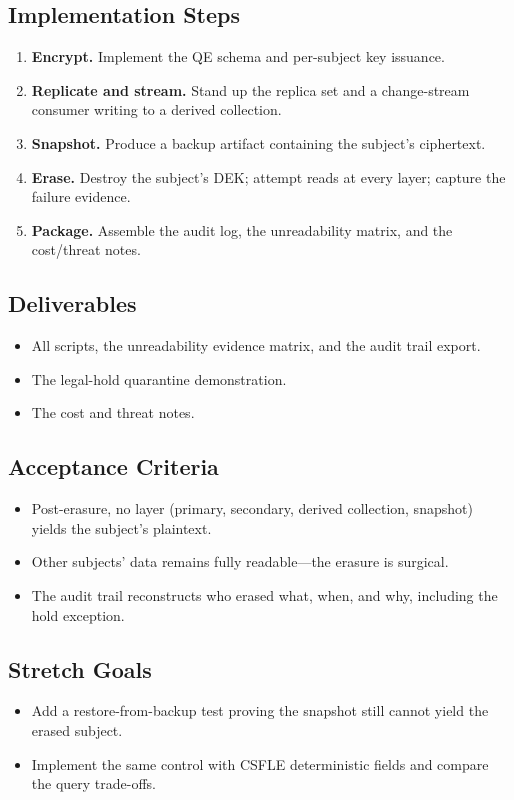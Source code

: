 \subsection*{Implementation Steps}
\begin{enumerate}
    \item \textbf{Encrypt.} Implement the QE schema and per-subject key issuance.
    \item \textbf{Replicate and stream.} Stand up the replica set and a change-stream consumer writing to a derived collection.
    \item \textbf{Snapshot.} Produce a backup artifact containing the subject's ciphertext.
    \item \textbf{Erase.} Destroy the subject's DEK; attempt reads at every layer; capture the failure evidence.
    \item \textbf{Package.} Assemble the audit log, the unreadability matrix, and the cost/threat notes.
\end{enumerate}

\subsection*{Deliverables}
\begin{itemize}
    \item All scripts, the unreadability evidence matrix, and the audit trail export.
    \item The legal-hold quarantine demonstration.
    \item The cost and threat notes.
\end{itemize}

\subsection*{Acceptance Criteria}
\begin{itemize}
    \item Post-erasure, no layer (primary, secondary, derived collection, snapshot) yields the subject's plaintext.
    \item Other subjects' data remains fully readable---the erasure is surgical.
    \item The audit trail reconstructs who erased what, when, and why, including the hold exception.
\end{itemize}

\subsection*{Stretch Goals}
\begin{itemize}
    \item Add a restore-from-backup test proving the snapshot still cannot yield the erased subject.
    \item Implement the same control with CSFLE deterministic fields and compare the query trade-offs.
\end{itemize}